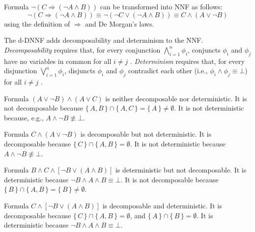 \begin{example}
  Formula $\neg(C \Rightarrow (\neg A \land B))$ can be transformed into NNF as
  follows:
  \[
  \neg(C \Rightarrow (\neg A \land B)) \equiv \neg(\neg C \lor (\neg A \land B)) \equiv C \land (A \lor \neg B)
  \]
  using the definition of $\Rightarrow$ and De Morgan's laws.
\end{example}

\begin{definition}
  The d-DNNF adds decomposability and determinism to the NNF\@.
  \emph{Decomposability} requires that, for every conjunction
  $\bigwedge_{i=1}^n \phi_i$, conjuncts $\phi_i$ and $\phi_j$ have no variables
  in common for all $i \ne j$
  \citep{DBLP:conf/ijcai/Darwiche99,DBLP:journals/jacm/Darwiche01}.
  \emph{Determinism} requires that, for every disjunction
  $\bigvee_{i=1}^n \phi_i$, disjuncts $\phi_i$ and $\phi_j$ contradict each
  other (i.e., $\phi_i \land \phi_j \equiv \bot$) for all $i \ne j$
  \citep{DBLP:journals/jancl/Darwiche01}.
\end{definition}

\begin{example}
  Formula $(A \lor \neg B) \land (A \lor C)$ is neither decomposable nor
  deterministic. It is not decomposable because
  $\{\, A, B \,\} \cap \{\, A, C \,\} = \{\, A \,\} \ne \emptyset$. It is not
  deterministic because, e.g., $A \land \neg B \not\equiv \bot$.
\end{example}

\begin{example}\label{example:ddnnf1}
  Formula $C \land (A \lor \neg B)$ is decomposable but not deterministic. It is
  decomposable because $\{\, C \,\} \cap \{\, A, B \,\} = \emptyset$. It is not
  deterministic because $A \land \neg B \not\equiv \bot$.
\end{example}

\begin{example}
  Formula $B \land C \land [\neg B \lor (A \land B)]$ is deterministic but not
  decomposable. It is deterministic because
  $\neg B \land A \land B \equiv \bot$. It is not decomposable because
  $\{\, B \,\} \cap \{\, A, B \,\} = \{\, B \,\} \ne \emptyset$.
\end{example}

\begin{example}\label{example:ddnnf2}
  Formula $C \land [\neg B \lor (A \land B)]$ is decomposable and deterministic.
  It is decomposable because $\{\, C \,\} \cap \{\, A, B \,\} = \emptyset$, and
  $\{\, A \,\} \cap \{\, B \,\} = \emptyset$. It is deterministic because
  $\neg B \land A \land B \equiv \bot$.
\end{example}

